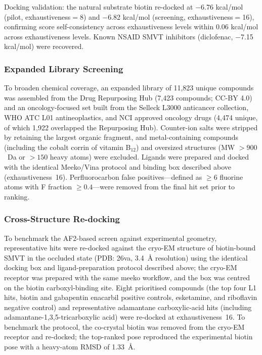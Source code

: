 \documentclass[pdflatex,sn-nature]{sn-jnl}
\begin{document}
Docking validation: the natural substrate biotin re-docked at $-$6.76 kcal/mol (pilot, exhaustiveness$=$8) and $-$6.82 kcal/mol (screening, exhaustiveness$=$16), confirming score self-consistency across exhaustiveness levels within 0.06 kcal/mol across exhaustiveness levels. Known NSAID SMVT inhibitors (diclofenac, $-$7.15 kcal/mol) were recovered.

\subsubsection*{Expanded Library Screening}
To broaden chemical coverage, an expanded library of 11,823 unique compounds was assembled from the Drug Repurposing Hub (7,423 compounds; CC-BY 4.0) and an oncology-focused set built from the Selleck L3000 anticancer collection, WHO ATC L01 antineoplastics, and NCI approved oncology drugs (4,474 unique, of which 1,922 overlapped the Repurposing Hub). Counter-ion salts were stripped by retaining the largest organic fragment, and metal-containing compounds (including the cobalt corrin of vitamin B$_{12}$) and oversized structures (MW $> 900$~Da or $>150$ heavy atoms) were excluded. Ligands were prepared and docked with the identical Meeko/Vina protocol and binding box described above (exhaustiveness~16). Perfluorocarbon false positives---defined as $\geq 6$ fluorine atoms with F fraction $\geq 0.4$---were removed from the final hit set prior to ranking.

\subsubsection*{Cross-Structure Re-docking}
To benchmark the AF2-based screen against experimental geometry, representative hits were re-docked against the cryo-EM structure of biotin-bound SMVT in the occluded state (PDB: 26va, 3.4~\AA{} resolution) using the identical docking box and ligand-preparation protocol described above; the cryo-EM receptor was prepared with the same meeko workflow, and the box was centred on the biotin carboxyl-binding site. Eight prioritised compounds (the top four L1 hits, biotin and gabapentin enacarbil positive controls, esketamine, and riboflavin negative control) and representative adamantane carboxylic-acid hits (including adamantane-1,3,5-tricarboxylic acid) were re-docked at exhaustiveness~16. To benchmark the protocol, the co-crystal biotin was removed from the cryo-EM receptor and re-docked; the top-ranked pose reproduced the experimental biotin pose with a heavy-atom RMSD of 1.33~\AA{}.
\end{document}
